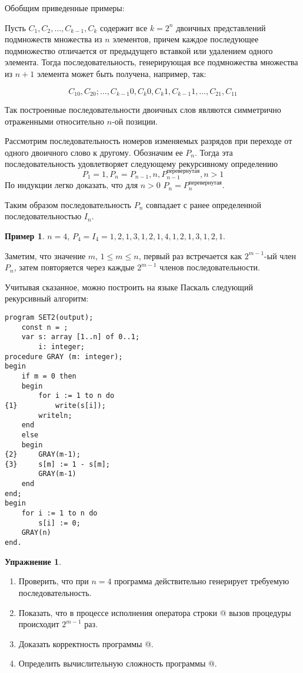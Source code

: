 \documentclass[12pt,a4paper]{article}
\theoremstyle{plain}
\theoremstyle{definition}
\newtheorem*{task}{Упражнение}
\newtheorem*{example}{Пример}
\theoremstyle{remark}
\begin{document}
Обобщим приведенные примеры:

Пусть $C_1, C_2, \ldots, C_{k-1}, C_k$ содержит все $k=2^n$ двоичных представлений подмножеств множества из $n$ элементов, причем каждое последующее подмножество отличается от предыдущего вставкой или удалением одного элемента. Тогда последовательность, генерирующая все подмножества множества из $n+1$ элемента может быть получена, например, так:

\begin{equation}
\label{eq:gray_codes}
C_10, C_20; \ldots, C_{k-1}0, C_k0, C_k1, C_{k-1}1, \ldots, C_21, C_11
\end{equation}

Так построенные последовательности двоичных слов являются симметрично отраженными относительно $n$-ой позиции.

Рассмотрим последовательность номеров изменяемых разрядов при переходе от одного двоичного слово к другому. Обозначим ее $P_n$. Тогда эта последовательность удовлетворяет следующему рекурсивному определению 
\[ P_1 = 1, P_n = P_{n-1}, n, P_{n-1}^{\mbox{перевернутая}}, n > 1 \]
По индукции легко доказать, что для $n>0$ $P_n = P_n^{\mbox{перевернутая}}$. 

Таким образом последовательность $P_n$ совпадает с ранее определенной последовательностью $I_n$.

\begin{example}
$n = 4$, $P_4 = I_4 = 1, 2, 1, 3, 1, 2, 1, 4, 1, 2, 1, 3, 1, 2, 1$.
\end{example}

Заметим, что значение $m$, $1\le m\le n$, первый раз встречается как $2^{m-1}$-ый член $P_n$, затем повторяется через каждые $2^{m-1}$ членов последовательности.

Учитывая сказанное, можно построить на языке Паскаль следующий рекурсивный алгоритм:

\begin{verbatim}
program SET2(output);
    const n = ;
    var s: array [1..n] of 0..1;
        i: integer;
procedure GRAY (m: integer);
begin
    if m = 0 then
    begin
        for i := 1 to n do
{1}         write(s[i]);
        writeln;
    end
    else
    begin
{2}     GRAY(m-1);
{3}     s[m] := 1 - s[m];
        GRAY(m-1)
    end
end;
begin
    for i := 1 to n do
        s[i] := 0;
    GRAY(n)
end.
\end{verbatim}

\begin{task}
~\\
\begin{enumerate}
\item Проверить, что при $n=4$ программа действительно генерирует требуемую последовательность.
\item Показать, что в процессе исполнения оператора строки @ вызов процедуры \verb@GRAY@ происходит $2^{m-1}$ раз.
\item Доказать корректность программы @.
\item Определить вычислительную сложность программы @.
\end{enumerate}
\end{task}
\end{document}
